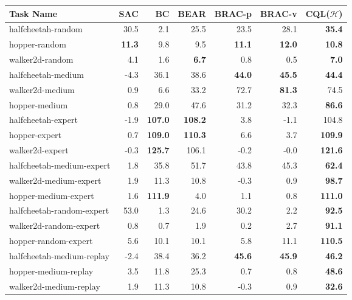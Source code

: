 \begin{table}[h]
\begin{tabular}{l|r|r|r|r|r||r}
\hline
\textbf{Task Name} & \textbf{SAC} & \textbf{BC} & \textbf{BEAR} & \textbf{BRAC-p} & \textbf{BRAC-v} & \textbf{CQL($\mathcal{H}$)}\\ \hline
halfcheetah-random &  30.5 & 2.1 & 25.5 & 23.5 & 28.1 & \textbf{35.4} \\
hopper-random & \textbf{11.3} & 9.8 & 9.5 & \textbf{11.1} & \textbf{12.0} & \textbf{10.8}\\
walker2d-random & 4.1 & 1.6 & \textbf{6.7} & 0.8 & 0.5 & \textbf{7.0}\\ \hline
halfcheetah-medium & -4.3 & 36.1 & 38.6 & \textbf{44.0} & \textbf{45.5} & \textbf{44.4}\\
walker2d-medium & 0.9 & 6.6  & 33.2 & 72.7 & \textbf{81.3} & {74.5}\\
hopper-medium & 0.8 & 29.0 & 47.6 & 31.2 & 32.3 & \textbf{86.6}\\ \hline
halfcheetah-expert & -1.9 & \textbf{107.0} & \textbf{108.2} & 3.8 & -1.1 & {104.8}\\
hopper-expert & 0.7 & \textbf{109.0} & \textbf{110.3} & 6.6 & 3.7 & \textbf{109.9} \\
walker2d-expert & -0.3 & \textbf{125.7} & 106.1 & -0.2 & -0.0 & \textbf{121.6} \\ \hline
halfcheetah-medium-expert & 1.8 & 35.8 & 51.7 & 43.8 & 45.3 & \textbf{62.4}\\
walker2d-medium-expert & 1.9 & 11.3 & 10.8 & -0.3 & 0.9 & \textbf{98.7}\\
hopper-medium-expert & 1.6 & \textbf{111.9} & 4.0 & 1.1 & 0.8 & \textbf{111.0}\\ \hline
halfcheetah-random-expert & 53.0 & 1.3 & 24.6 & 30.2 & 2.2 & \textbf{92.5}\\
walker2d-random-expert & 0.8 & 0.7 & 1.9 & 0.2 & 2.7 & \textbf{91.1}\\
hopper-random-expert & 5.6 & 10.1 & 10.1 & 5.8 & 11.1 & \textbf{110.5} \\ \hline
halfcheetah-medium-replay & -2.4 & 38.4 & 36.2 & \textbf{45.6} & \textbf{45.9} & \textbf{46.2}\\
hopper-medium-replay & 3.5 & 11.8 & 25.3 & 0.7 & 0.8 & \textbf{48.6}\\
walker2d-medium-replay & 1.9 & 11.3 & 10.8 & -0.3 & 0.9 & \textbf{32.6}\\
\hline
\end{tabular}
\end{table}

